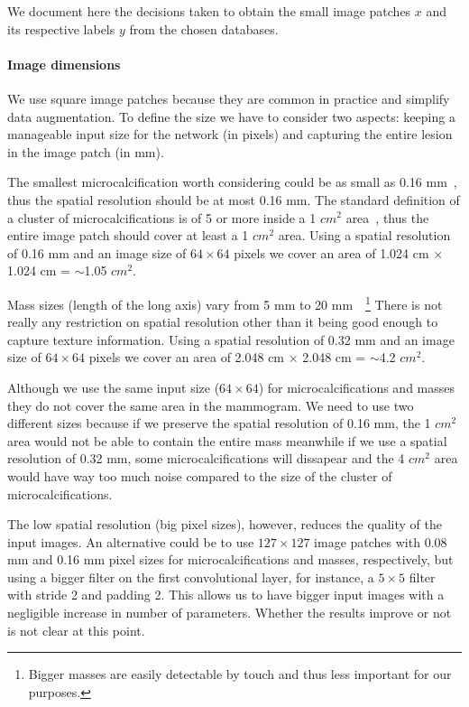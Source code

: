 We document here the decisions taken to obtain the small image patches $x$ and its respective labels $y$ from the chosen databases.

\paragraph{Image dimensions}
We use square image patches because they are common in practice and simplify data augmentation. To define the size we have to consider two aspects: keeping a manageable input size for the network (in pixels) and capturing the entire lesion in the image patch (in mm).

The smallest microcalcification worth considering could be as small as 0.16 mm~\cite{Lo1998}, thus the spatial resolution should be at most 0.16 mm. The standard definition of a cluster of microcalcifications is of 5 or more inside a 1 $cm^2$ area~\cite{Sickles2013}, thus the entire image patch should cover at least a 1 $cm^2$ area. Using a spatial resolution of 0.16 mm and an image size of $64 \times 64$ pixels we cover an area of 1.024 cm $\times$ 1.024 cm = $\sim$1.05 $cm^2$.

Mass sizes (length of the long axis) vary from 5 mm to 20 mm~\cite{Sahiner1996}~\footnote{Bigger masses are easily detectable by touch and thus less important for our purposes.} There is not really any restriction on spatial resolution other than it being good enough to capture texture information. Using a spatial resolution of 0.32 mm and an image size of $64 \times 64$ pixels we cover an area of 2.048 cm $\times$ 2.048 cm = $\sim$4.2 $cm^2$.

Although we use the same input size ($64 \times 64$) for microcalcifications and masses they do not cover the same area in the mammogram. We need to use two different sizes because if we preserve the spatial resolution of 0.16 mm, the 1 $cm^2$ area would not be able to contain the entire mass meanwhile if we use a spatial resolution of 0.32 mm, some microcalcifications will dissapear and the 4 $cm^2$ area would have way too much noise compared to the size of the cluster of microcalcifications.

The low spatial resolution (big pixel sizes), however, reduces the quality of the input images. An alternative could be to use $127 \times 127$ image patches with 0.08 mm and 0.16 mm pixel sizes for microcalcifications and masses, respectively, but using a bigger filter on the first convolutional layer, for instance, a $5 \times 5$ filter with stride 2 and padding 2. This allows us to have bigger input images with a negligible increase in number of parameters. Whether the results improve or not is not clear at this point.

